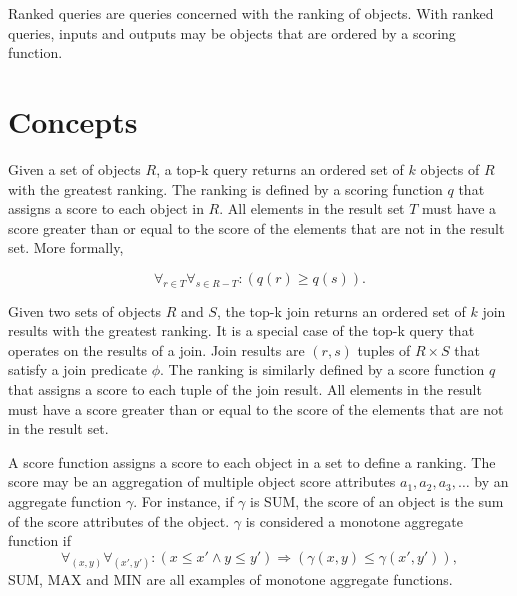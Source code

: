 Ranked queries are queries concerned with the ranking of objects. With ranked queries, inputs and outputs may be objects that are ordered by a scoring function.

\section{Concepts}

Given a set of objects \(R\), a top-k query returns an ordered set of \(k\) objects of \(R\) with the greatest ranking. The ranking is defined by a scoring function \(q\) that assigns a score to each object in \(R\). All elements in the result set \(T\) must have a score greater than or equal to the score of the elements that are not in the result set. More formally,

\[
  \forall_{r \in T}
  \forall_{s \in R - T} :
  \left(q(r) \geq q(s) \right).
\]

Given two sets of objects \(R\) and \(S\), the top-k join returns an ordered set of \(k\) join results with the greatest ranking. It is a special case of the top-k query that operates on the results of a join. Join results are \((r, s)\) tuples of \(R \times S\) that satisfy a join predicate \(\phi\). The ranking is similarly defined by a score function \(q\) that assigns a score to each tuple of the join result. All elements in the result must have a score greater than or equal to the score of the elements that are not in the result set.

A score function assigns a score to each object in a set to define a ranking. The score may be an aggregation of multiple object score attributes \(a_1, a_2, a_3, \dotsc\) by an aggregate function \(\gamma\). For instance, if \(\gamma\) is SUM, the score of an object is the sum of the score attributes of the object. \(\gamma\) is considered a monotone aggregate function if
\[
  \forall_{(x, y)} \forall_{(x', y')} :
  \left(
  x \leq x'
  \land
  y \leq y'
  \right)
  \Rightarrow
  \left(
  \gamma(x, y) \leq \gamma(x', y')
  \right),
\]
SUM, MAX and MIN are all examples of monotone aggregate functions.

